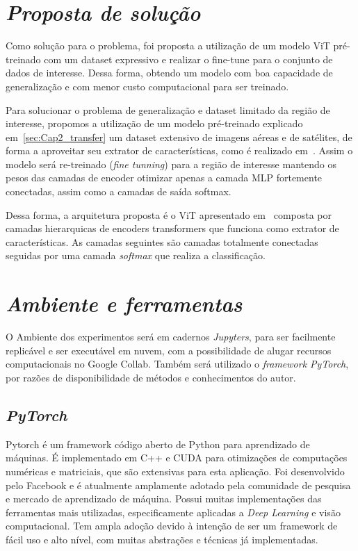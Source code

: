 \section{\textit{Proposta de solução}}\label{sec:Cap3_Proposta}

Como solução para o problema, foi proposta a utilização de um modelo ViT pré-treinado com um dataset expressivo e realizar o fine-tune para o conjunto de dados de interesse. Dessa forma, obtendo um modelo com boa capacidade de generalização e com menor custo computacional para ser treinado.

Para solucionar o problema de generalização e dataset limitado da região de interesse, propomos a utilização de um modelo pré-treinado explicado em~\ref{sec:Cap2_transfer} um dataset extensivo de imagens aéreas e de satélites, de forma a aproveitar seu extrator de características, como é realizado em~\cite{Shiguemori2016Embedded}. Assim o modelo será re-treinado (\textit{fine tunning}) para a região de interesse mantendo os pesos das camadas de encoder otimizar apenas a camada MLP fortemente conectadas, assim como a camadas de saída softmax. 

Dessa forma, a arquitetura proposta é o ViT apresentado em~\cite{wang2022empirical}
composta por camadas hierarquicas de encoders transformers  que funciona como extrator de características. As camadas seguintes são camadas totalmente conectadas seguidas por uma camada \textit{softmax} que realiza a classificação.

\section{\textit{Ambiente e ferramentas}}\label{sec:Cap3_Ferramentas}


O Ambiente dos experimentos será em cadernos \textit{Jupyters}, para ser facilmente replicável e ser executável em nuvem, com a possibilidade de alugar recursos computacionais no Google Collab. Também será utilizado o \textit{framework PyTorch}, por razões de disponibilidade de métodos e conhecimentos do autor.

\subsection{\textit{PyTorch}}\label{sec:Cap2_PyTorch}
Pytorch é um framework código aberto de Python para aprendizado de máquinas. É implementado em C++ e CUDA para otimizações de computações numéricas e matriciais, que são extensivas para esta aplicação.
Foi desenvolvido pelo Facebook e é atualmente amplamente adotado pela comunidade de pesquisa e mercado de aprendizado de máquina. Possui muitas implementações das ferramentas mais utilizadas, especificamente aplicadas a \textit{Deep Learning} e visão computacional. Tem ampla adoção devido à intenção de ser um framework de fácil uso e alto nível, com muitas abstrações e técnicas já implementadas.



